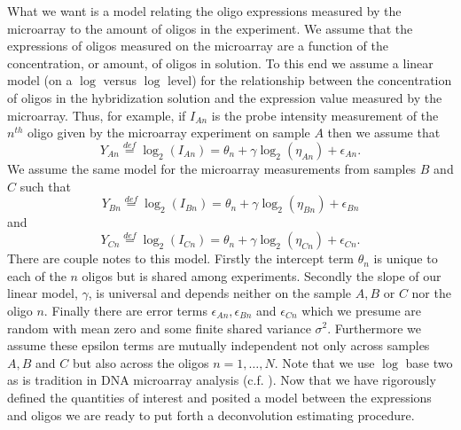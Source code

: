 \documentclass[reqno,12pt,oneside]{report}\usepackage[]{graphicx}\usepackage[]{color}
\theoremstyle{plain}
\theoremstyle{definition}
\theoremstyle{remark}
\numberwithin{theorem}{chapter}     %
\begin{document}
What we want is a model relating the oligo expressions measured by the microarray to the amount of oligos in the experiment. We assume that the expressions of oligos measured on the microarray are a function of the concentration, or amount, of oligos in solution. To this end we assume a linear model (on a $\log$ versus $\log$ level) for the relationship between the concentration of oligos in the hybridization solution and the expression value measured by the microarray. Thus, for example, if $I_{An}$ is the probe intensity measurement of the $n^{th}$ oligo given by the microarray experiment on sample $A$ then we assume that 
\[
Y_{An}\overset{def}{=}\log_2\left(I_{An}\right) = \theta_n + \gamma\log_2\left(\eta_{An}\right) + \epsilon_{An}.
\]
We assume the same model for the microarray measurements from samples $B$ and $C$ such that 
\[
Y_{Bn}\overset{def}{=}\log_2\left(I_{Bn}\right) = \theta_n + \gamma\log_2\left(\eta_{Bn}\right) + \epsilon_{Bn}
\]
and 
\[
Y_{Cn}\overset{def}{=}\log_2\left(I_{Cn}\right) = \theta_n + \gamma\log_2\left(\eta_{Cn}\right) + \epsilon_{Cn}.
\]
There are couple notes to this model. Firstly the intercept term $\theta_n$ is unique to each of the $n$ oligos but is shared among experiments. Secondly the slope of our linear model, $\gamma$, is universal and depends neither on the sample $A,B$ or $C$ nor the oligo $n$. Finally there are error terms $\epsilon_{An},\epsilon_{Bn}$ and $\epsilon_{Cn}$ which we presume are random with mean zero and some finite shared variance $\sigma^2$. Furthermore we assume these epsilon terms are mutually independent not only across samples $A,B$ and $C$ but also across the oligos $n=1,\ldots,N$. Note that we use $\log$ base two as is tradition in DNA microarray analysis (c.f. \citeauthor{Irizarry2003} \citeyear{Irizarry2003}). Now that we have rigorously defined the quantities of interest and posited a model between the expressions and oligos we are ready to put forth a deconvolution estimating procedure. 
\end{document}
